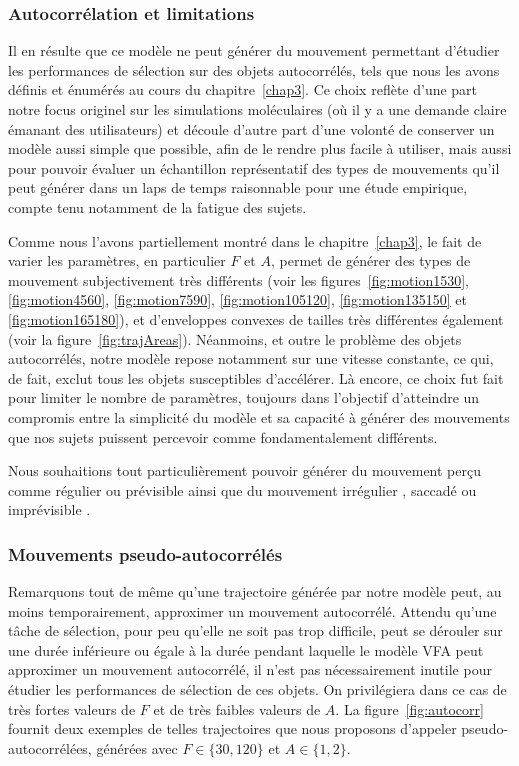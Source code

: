 	\subsubsection{Autocorrélation et limitations}
    Il en résulte que ce modèle ne peut générer du mouvement permettant d'étudier les performances de sélection sur des objets autocorrélés, tels que nous les avons définis et énumérés au cours du chapitre~\ref{chap3}. Ce choix reflète d'une part notre focus originel sur les simulations moléculaires (où il y a une demande claire émanant des utilisateurs) et découle d'autre part d'une volonté de conserver un modèle aussi simple que possible, afin de le rendre plus facile à utiliser, mais aussi pour pouvoir évaluer un échantillon représentatif des types de mouvements qu'il peut générer dans un laps de temps raisonnable pour une étude empirique, compte tenu notamment de la fatigue des sujets.
    
    Comme nous l'avons partiellement montré dans le chapitre~\ref{chap3}, le fait de varier les paramètres, en particulier $F$ et $A$, permet de générer des types de mouvement subjectivement très différents (voir les figures~\ref{fig:motion1530}, \ref{fig:motion4560}, \ref{fig:motion7590}, \ref{fig:motion105120}, \ref{fig:motion135150} et \ref{fig:motion165180}), et d'enveloppes convexes de tailles très différentes également (voir la figure~\ref{fig:trajAreas}). Néanmoins, et outre le problème des objets autocorrélés, notre modèle repose notamment sur une vitesse constante, ce qui, de fait, exclut tous les objets susceptibles d'accélérer. Là encore, ce choix fut fait pour limiter le nombre de paramètres, toujours dans l'objectif d'atteindre un compromis entre la simplicité du modèle et sa capacité à générer des mouvements que nos sujets puissent percevoir comme fondamentalement différents.
    
	Nous souhaitions tout particulièrement pouvoir générer du mouvement perçu comme \og régulier \fg{} ou \og prévisible \fg{} ainsi que du mouvement \og irrégulier \fg{}, \og saccadé \fg{} ou \og imprévisible \fg{}.
    
    \subsubsection{Mouvements pseudo-autocorrélés}
	Remarquons tout de même qu'une trajectoire générée par notre modèle peut, au moins temporairement, approximer un mouvement autocorrélé. Attendu qu'une tâche de sélection, pour peu qu'elle ne soit pas trop difficile, peut se dérouler sur une durée inférieure ou égale à la durée pendant laquelle le modèle VFA peut approximer un mouvement autocorrélé, il n'est pas nécessairement inutile pour étudier les performances de sélection de ces objets. On privilégiera dans ce cas de très fortes valeurs de $F$ et de très faibles valeurs de $A$. La figure~\ref{fig:autocorr} fournit deux exemples de telles trajectoires que nous proposons d'appeler pseudo-autocorrélées, générées avec $F \in \{30,120\}$ et $A \in \{1,2\}$.
	
